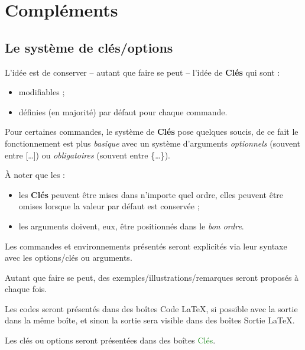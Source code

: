 \documentclass[a4paper,french,11pt]{article}
\newcommand\Cle[1]{{\bfseries\sffamily\textlangle #1\textrangle}}
\begin{document}
\pagebreak

\section{Compléments}

\subsection{Le système de \og clés/options \fg}

\begin{codeidee}
L'idée est de conserver -- autant que faire se peut -- l'idée de \Cle{Clés} qui sont :
%
\begin{itemize}
	\item modifiables ;
	\item définies (en majorité) par défaut pour chaque commande.
\end{itemize}

Pour certaines commandes, le système de \Cle{Clés} pose quelques soucis, de ce fait le fonctionnement est plus \textit{basique} avec un système d'\textsf{arguments} \textit{optionnels} (souvent entre \textsf{[\ldots]}) ou \textit{obligatoires} (souvent entre \textsf{\{\ldots\}}).

\smallskip

À noter que les :
%
\begin{itemize}
	\item les \Cle{Clés} peuvent être mises dans n'importe quel ordre, elles peuvent être omises lorsque la valeur par défaut est conservée ;
	\item les \textsf{arguments} doivent, eux, être positionnés dans le \textit{bon ordre}.
\end{itemize}
\end{codeidee}

\begin{codeinfo}
Les \textsf{commandes} et \textsf{environnements} présentés seront explicités via leur \textsf{syntaxe} avec les \textsf{options/clés} ou \textsf{arguments}.

Autant que faire se peut, des exemples/illustrations/remarques seront proposés à chaque fois.

\smallskip

Les \textsf{codes} seront présentés dans des \textsf{boîtes} \textcolor{red!75!black}{{\small \faCode} Code \LaTeX}, si possible avec la \textsf{sortie} dans la même boîte, et sinon la \textsf{sortie} sera visible dans des \textsf{boîtes} \textcolor{red!75!black}{{\small \faArrowAltCircleRight[regular]} Sortie \LaTeX}.

Les \textsf{clés} ou \textsf{options} seront présentées dans des \textsf{boîtes} \textcolor{ForestGreen}{{\small \faPaperclip} Clés}.
\end{codeinfo}
\end{document}
